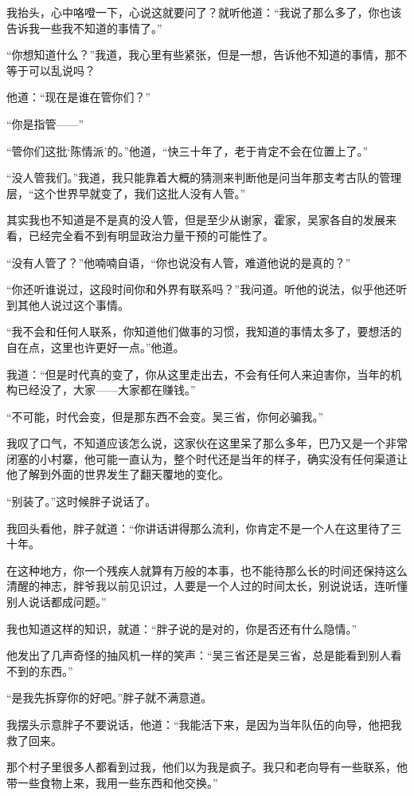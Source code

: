 我抬头，心中咯噔一下，心说这就要问了？就听他道：“我说了那么多了，你也该告诉我一些我不知道的事情了。”

“你想知道什么？”我道，我心里有些紧张，但是一想，告诉他不知道的事情，那不等于可以乱说吗？

他道：“现在是谁在管你们？”

“你是指管——”

“管你们这批‘陈情派’的。”他道，“快三十年了，老于肯定不会在位置上了。”

“没人管我们。”我道，我只能靠着大概的猜测来判断他是问当年那支考古队的管理层，“这个世界早就变了，我们这批人没有人管。”

其实我也不知道是不是真的没人管，但是至少从谢家，霍家，吴家各自的发展来看，已经完全看不到有明显政治力量干预的可能性了。

“没有人管了？”他喃喃自语，“你也说没有人管，难道他说的是真的？”

“你还听谁说过，这段时间你和外界有联系吗？”我问道。听他的说法，似乎他还听到其他人说过这个事情。

“我不会和任何人联系，你知道他们做事的习惯，我知道的事情太多了，要想活的自在点，这里也许更好一点。”他道。

我道：“但是时代真的变了，你从这里走出去，不会有任何人来迫害你，当年的机构已经没了，大家——大家都在赚钱。”

“不可能，时代会变，但是那东西不会变。吴三省，你何必骗我。”

我叹了口气，不知道应该怎么说，这家伙在这里呆了那么多年，巴乃又是一个非常闭塞的小村寨，他可能一直认为，整个时代还是当年的样子，确实没有任何渠道让他了解到外面的世界发生了翻天覆地的变化。

“别装了。”这时候胖子说话了。

我回头看他，胖子就道：“你讲话讲得那么流利，你肯定不是一个人在这里待了三十年。

在这种地方，你一个残疾人就算有万般的本事，也不能待那么长的时间还保持这么清醒的神志，胖爷我以前见识过，人要是一个人过的时间太长，别说说话，连听懂别人说话都成问题。”

我也知道这样的知识，就道：“胖子说的是对的，你是否还有什么隐情。”

他发出了几声奇怪的抽风机一样的笑声：“吴三省还是吴三省，总是能看到别人看不到的东西。”

“是我先拆穿你的好吧。”胖子就不满意道。

我摆头示意胖子不要说话，他道：“我能活下来，是因为当年队伍的向导，他把我救了回来。

那个村子里很多人都看到过我，他们以为我是疯子。我只和老向导有一些联系，他带一些食物上来，我用一些东西和他交换。”

